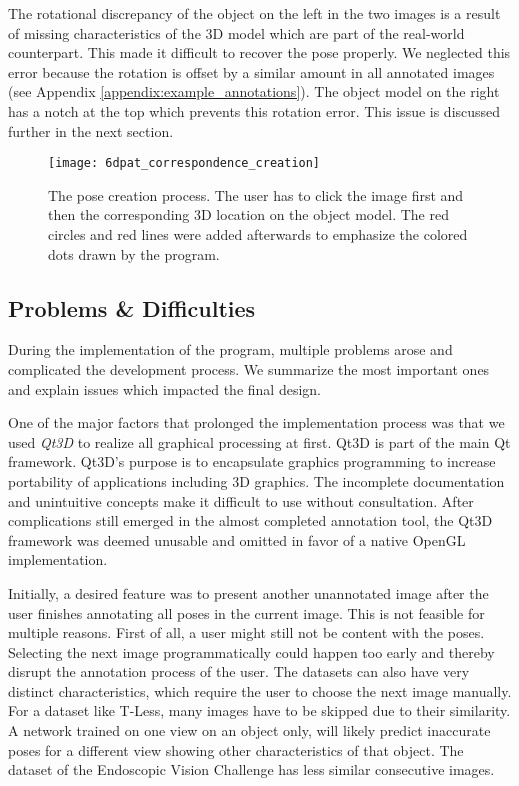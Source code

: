 The rotational discrepancy of the object on the left in the two images is a result of missing characteristics of the 3D model which are part of the real-world counterpart. This made it difficult to recover the pose properly. We neglected this error because the rotation is offset by a similar amount in all annotated images (see Appendix \ref{appendix:example_annotations}). The object model on the right has a notch at the top which prevents this rotation error. This issue is discussed further in the next section.

\begin{figure}[!tbp]
	\centering
    \texttt{[image: 6dpat\_correspondence\_creation]}
    \caption{The pose creation process. The user has to click the image first and then the corresponding 3D location on the object model. The red circles and red lines were added afterwards to emphasize the colored dots drawn by the program.}
    \label{fig:6dpat_correspondence_creation}
\end{figure} 

\subsection{Problems \& Difficulties} \label{section:6dpat_difficulties}

During the implementation of the program, multiple problems arose and complicated the development process. We summarize the most important ones and explain issues which impacted the final design.

One of the major factors that prolonged the implementation process was that we used \textit{Qt3D} to realize all graphical processing at first. Qt3D is part of the main Qt framework. Qt3D's purpose is to encapsulate graphics programming to increase portability of applications including 3D graphics. The incomplete documentation and unintuitive concepts make it difficult to use without consultation. After complications still emerged in the almost completed annotation tool, the Qt3D framework was deemed unusable and omitted in favor of a native OpenGL implementation.

Initially, a desired feature was to present another unannotated image after the user finishes annotating all poses in the current image. This is not feasible for multiple reasons. First of all, a user might still not be content with the poses. Selecting the next image programmatically could happen too early and thereby disrupt the annotation process of the user. The datasets can also have very distinct characteristics, which require the user to choose the next image manually. For a dataset like T-Less, many images have to be skipped due to their similarity. A network trained on one view on an object only, will likely predict inaccurate poses for a different view showing other characteristics of that object. The dataset of the Endoscopic Vision Challenge has less similar consecutive images.

